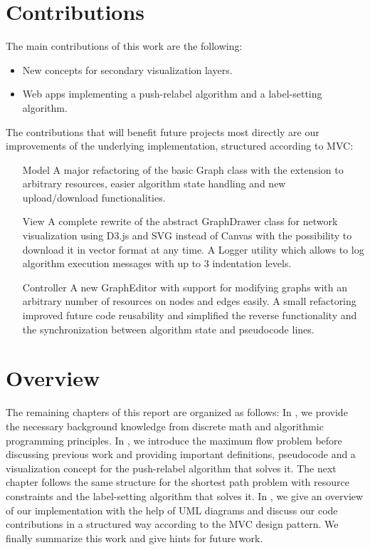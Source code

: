 \section{Contributions}
The main contributions of this work are the following:
\begin{itemize}
	\item New concepts for secondary visualization layers.
	\item Web apps implementing a push-relabel algorithm and a label-setting algorithm.
\end{itemize}
The contributions that will benefit future projects most directly are our improvements of the underlying implementation, structured according to MVC:
\begin{itemize}
	\item[Model] A major refactoring of the basic Graph class with the extension to arbitrary resources, easier algorithm state handling and new upload/download functionalities.
	\item[View] A complete rewrite of the abstract GraphDrawer class for network visualization using D3.js and SVG instead of Canvas with the possibility to download it in vector format at any time. A Logger utility which allows to log algorithm execution messages with up to 3 indentation levels.
	\item[Controller] A new GraphEditor with support for modifying graphs with an arbitrary number of resources on nodes and edges easily. A small refactoring improved future code reusability and simplified the reverse functionality and the synchronization between algorithm state and pseudocode lines.
\end{itemize}


\section{Overview}
The remaining chapters of this report are organized as follows: In , we provide the necessary background knowledge from discrete math and algorithmic programming principles. In , we introduce the maximum flow problem before discussing  previous work and providing important definitions, pseudocode and a visualization concept for the push-relabel algorithm that solves it. The next chapter  follows the same structure for the shortest path problem with resource constraints and the label-setting algorithm that solves it. In , we give an overview of our implementation with the help of UML diagrams and discuss our code contributions in a structured way according to the MVC design pattern. We finally  summarize this work and give hints for future work.
